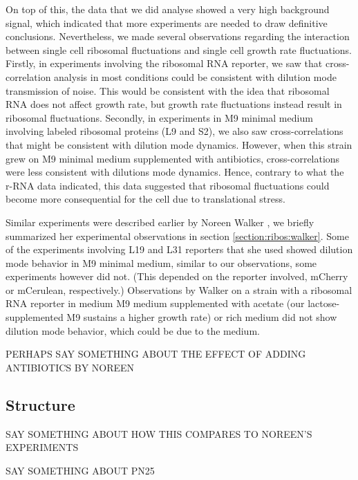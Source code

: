 On top of this, the data that we did analyse showed a very high background signal, which indicated that more experiments are needed to draw definitive conclusions.
%
Nevertheless, we made several observations regarding the interaction between single cell ribosomal fluctuations and single cell growth rate fluctuations.
%
Firstly, in experiments involving the ribosomal RNA reporter, we saw that cross-correlation analysis in most conditions could be consistent with dilution mode transmission of noise.
This would be consistent with the idea that ribosomal RNA does not affect growth rate, but growth rate fluctuations instead result in ribosomal fluctuations.
%
Secondly, in experiments in M9 minimal medium involving labeled ribosomal proteins (L9 and S2), we also saw cross-correlations that might be consistent with dilution mode dynamics.
However, when this strain grew on M9 minimal medium supplemented with antibiotics, cross-correlations were less consistent with dilutions mode dynamics.
Hence, contrary to what the r-RNA data indicated, this data suggested that ribosomal fluctuations could become more consequential for the cell due to translational stress.

Similar experiments were described earlier by Noreen Walker \cite{Walker2016t}, 
we briefly summarized her experimental observations in section \ref{section:ribos:walker}.
%
Some of the experiments involving L19 and L31 reporters that she used showed dilution mode behavior in M9 minimal medium, similar to our observations, some experiments however did not. (This depended on the reporter involved, mCherry or mCerulean, respectively.)
%
Observations by Walker on a strain with a ribosomal RNA reporter in medium M9 medium supplemented with acetate (our lactose-supplemented M9 sustains a higher growth rate) or rich medium did not show dilution mode behavior, which could be due to the medium.
%

PERHAPS SAY SOMETHING ABOUT THE EFFECT OF ADDING ANTIBIOTICS BY NOREEN



\subsection{Structure}


SAY SOMETHING ABOUT HOW THIS COMPARES TO NOREEN'S EXPERIMENTS

SAY SOMETHING ABOUT PN25


